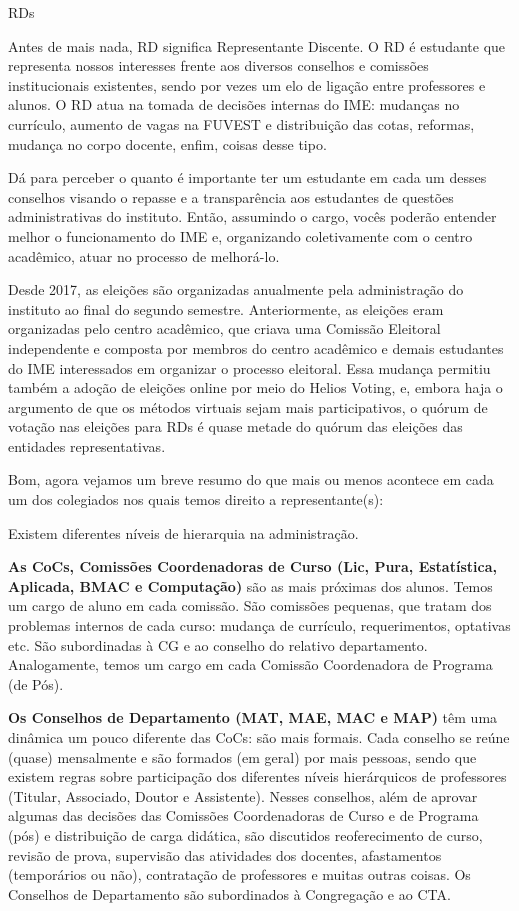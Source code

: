 \begin{subsecao}{RDs}

Antes de mais nada, RD significa Representante Discente. O RD é estudante que
representa nossos interesses frente aos diversos conselhos e comissões institucionais
existentes, sendo por vezes um elo de ligação entre professores e alunos. O RD
atua na tomada de decisões internas do IME: mudanças no currículo, aumento de vagas na 
FUVEST e distribuição das cotas, reformas, mudança no corpo docente, enfim, coisas desse tipo.

Dá para perceber o quanto é importante ter um estudante em cada um
desses conselhos visando o repasse e a transparência aos estudantes de questões administrativas 
do instituto. Então, assumindo o cargo, vocês poderão entender melhor o funcionamento do IME e, 
organizando coletivamente com o centro acadêmico, atuar no processo de melhorá-lo.

Desde 2017, as eleições são organizadas anualmente pela administração do instituto ao final do 
segundo semestre. Anteriormente, as eleições eram organizadas pelo centro acadêmico, que criava 
uma Comissão Eleitoral independente e composta por membros do centro acadêmico e demais estudantes 
do IME interessados em organizar o processo eleitoral. Essa mudança permitiu também a 
adoção de eleições online por meio do Helios Voting, e, embora haja o argumento de que os métodos 
virtuais sejam mais participativos, o quórum de votação nas eleições para RDs é quase metade do 
quórum das eleições das entidades representativas.


Bom, agora vejamos um breve resumo do que mais ou menos acontece em cada um dos colegiados 
nos quais temos direito a representante(s):

Existem diferentes níveis de hierarquia na administração.

{\bf As CoCs,
Comissões Coordenadoras de Curso (Lic, Pura, Estatística, Aplicada, BMAC e
Computação)} são as mais próximas dos alunos. Temos um cargo de aluno em cada
comissão. São comissões pequenas, que tratam dos problemas internos de cada
curso: mudança de currículo, requerimentos, optativas etc. São subordinadas
à CG e ao conselho do relativo departamento. Analogamente, temos um cargo em cada
Comissão Coordenadora de Programa (de Pós).


{\bf Os Conselhos de Departamento (MAT, MAE, MAC e MAP)} têm uma dinâmica um
pouco diferente das CoCs: são mais formais. Cada conselho se reúne (quase)
mensalmente e são formados (em geral) por mais pessoas, sendo que existem
regras sobre participação dos diferentes níveis hierárquicos de
professores (Titular, Associado, Doutor e Assistente). Nesses conselhos, além
de aprovar algumas das decisões das Comissões Coordenadoras de Curso e de
Programa (pós) e distribuição de carga didática, são discutidos reoferecimento
de curso, revisão de prova, supervisão das atividades dos docentes,
afastamentos (temporários ou não), contratação de professores e muitas outras
coisas.
Os Conselhos de Departamento são subordinados à Congregação e ao CTA.


\end{subsecao}

